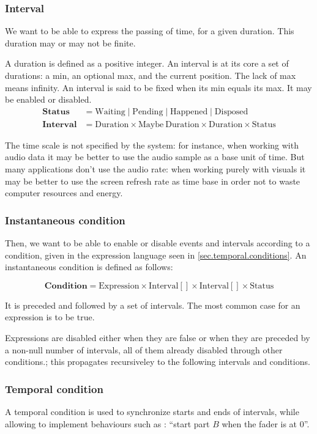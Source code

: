 \documentclass[applsci,article,submit,moreauthors,pdftex,10pt,a4paper]{mdpi}
\begin{document}
\subsubsection{Interval}
We want to be able to express the passing of time, for a given duration.
This duration may or may not be finite.

A duration is defined as a positive integer.
An interval is at its core a set of durations: a min, an optional max, and the current position. 
The lack of max means infinity.
An interval is said to be fixed when its min equals its max. It may be enabled or disabled.
\begin{align*}
\mathbf{Status} &= \mathrm{Waiting} \mid \mathrm{Pending} \mid \mathrm{Happened} \mid \mathrm{Disposed} \\
\mathbf{Interval} &= \mathrm{Duration} \times \mathrm{Maybe} ~\mathrm{Duration} \times \mathrm{Duration} \times \mathrm{Status}
\end{align*}

The time scale is not specified by the system: for instance, when working with audio data it may be better to use the audio sample as a base unit of time.
But many applications don't use the audio rate: when working purely with visuals it may be better to use the screen refresh rate as time base in order not to 
waste computer resources and energy. 

\subsubsection{Instantaneous condition}
Then, we want to be able to enable or disable events and intervals according to a condition, given in the expression language seen in \ref{sec.temporal.conditions}. An instantaneous condition is defined as follows: 

\[
\mathbf{Condition} = \mathrm{Expression} \times \mathrm{Interval}[] \times \mathrm{Interval}[] \times \mathrm{Status}
\]

It is preceded and followed by a set of intervals.
The most common case for an expression is to be true.

Expressions are disabled either when they are false or when they are preceded by a non-null number of intervals, all of them already disabled through other conditions.; this propagates recursiveley to the following intervals and conditions. 


\subsubsection{Temporal condition}
A temporal condition is used to synchronize starts and ends of intervals, while allowing to implement behaviours such as : ``start part $B$ when the fader is at 0''.
\end{document}
